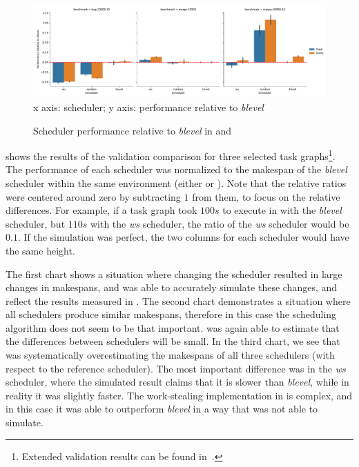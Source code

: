 \begin{figure}
	\caption{Scheduler performance relative to \emph{blevel} in \dask{} and \estee}
	\label{fig:estee-validation}
	\centering
	\includegraphics[width=\textwidth]{imgs/estee/charts/estee-validation}\\
	{\small x axis: scheduler; y axis: performance relative to \emph{blevel}}
\end{figure}

 shows the results of the validation comparison for three selected
task graphs\footnote{Extended validation results can be found in~\cite{estee}.}. The performance of each scheduler was normalized to the
makespan of the \emph{blevel} scheduler within the same environment (either
\estee{} or \dask{}). Note that the relative ratios were centered
around zero by subtracting $1$ from them, to focus on the relative differences.
For example, if a task graph took $100s$ to execute in \dask{} with
the \emph{blevel} scheduler, but $110s$ with the \emph{ws}
scheduler, the ratio of the \emph{ws} scheduler would be $0.1$. If
the simulation was perfect, the two columns for each scheduler would have the same height.

The first chart shows a situation where changing the scheduler resulted in large changes in
makespans, and \estee{} was able to accurately simulate these changes, and reflect
the results measured in \dask{}. The second chart demonstrates a situation where
all schedulers produce similar makespans, therefore in this case the scheduling algorithm does not
seem to be that important. \estee{} was again able to estimate that the differences
between schedulers will be small. In the third chart, we see that \estee{} was
systematically overestimating the makespans of all three schedulers (with respect to the reference
scheduler). The most important difference was in the \emph{ws} scheduler, where the
simulated result claims that it is slower than \emph{blevel}, while in reality it was
slightly faster. The work-stealing implementation in \dask{} is complex, and in
this case it was able to outperform \emph{blevel} in a way that \estee{}
was not able to simulate.


